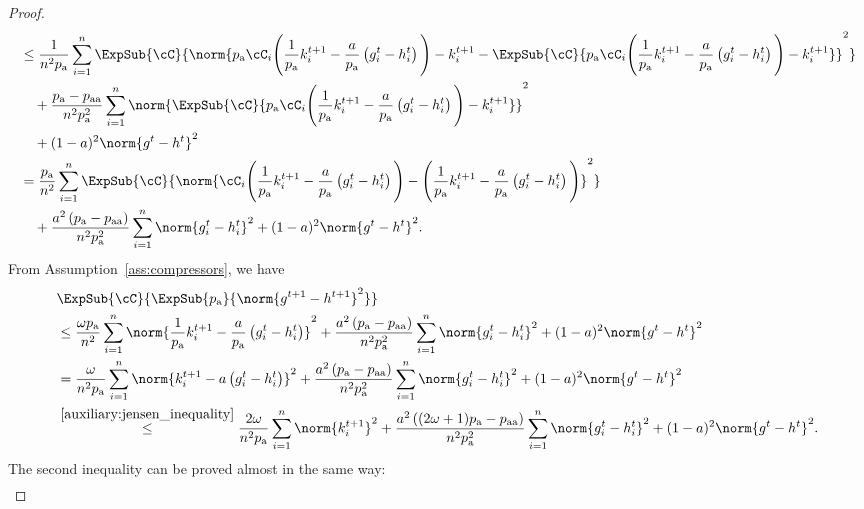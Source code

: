 \documentclass{article}
\newcommand*{\probavailable}{\ensuremath{p_{\textnormal{a}}}}
\newcommand*{\probpairaa}{\ensuremath{p_{\textnormal{aa}}}}
\begin{document}
\begin{proof}
\begin{align*}
    &\leq \frac{1}{n^2 \probavailable}\sum_{i=1}^n\ExpSub{\cC}{\norm{\probavailable\cC_i\Bigg(\frac{1}{\probavailable}k^{t+1}_i - \frac{a}{\probavailable} \left(g^{t}_i - h^{t}_i\right)\Bigg) - k^{t+1}_i - \ExpSub{\cC}{\probavailable\cC_i\Bigg(\frac{1}{\probavailable}k^{t+1}_i - \frac{a}{\probavailable} \left(g^{t}_i - h^{t}_i\right)\Bigg) - k^{t+1}_i}}^2} \\
    &\quad +\frac{\probavailable - \probpairaa}{n^2 \probavailable^2}\sum_{i=1}^n\norm{\ExpSub{\cC}{\probavailable\cC_i\Bigg(\frac{1}{\probavailable}k^{t+1}_i - \frac{a}{\probavailable} \left(g^{t}_i - h^{t}_i\right)\Bigg) - k^{t+1}_i}}^2 \\
    &\quad + (1 - a)^2\norm{g^{t} - h^{t}}^2 \\
    &= \frac{\probavailable}{n^2}\sum_{i=1}^n\ExpSub{\cC}{\norm{\cC_i\Bigg(\frac{1}{\probavailable}k^{t+1}_i - \frac{a}{\probavailable} \left(g^{t}_i - h^{t}_i\right)\Bigg) - \Bigg(\frac{1}{\probavailable}k^{t+1}_i - \frac{a}{\probavailable} \left(g^{t}_i - h^{t}_i\right)\Bigg)}^2} \\
    &\quad +\frac{a^2 \left(\probavailable - \probpairaa\right)}{n^2 \probavailable^2}\sum_{i=1}^n\norm{g^{t}_i - h^{t}_i}^2 + (1 - a)^2\norm{g^{t} - h^{t}}^2.
  \end{align*}
  From Assumption~\ref{ass:compressors}, we have
  \begin{align*}
    &\ExpSub{\cC}{\ExpSub{\probavailable}{\norm{g^{t+1} - h^{t+1}}^2}} \\
    &\leq \frac{\omega \probavailable}{n^2}\sum_{i=1}^n\norm{\frac{1}{\probavailable}k^{t+1}_i - \frac{a}{\probavailable} \left(g^{t}_i - h^{t}_i\right)}^2 +\frac{a^2 \left(\probavailable - \probpairaa\right)}{n^2 \probavailable^2}\sum_{i=1}^n\norm{g^{t}_i - h^{t}_i}^2 + (1 - a)^2\norm{g^{t} - h^{t}}^2 \\
    &= \frac{\omega}{n^2 \probavailable}\sum_{i=1}^n\norm{k^{t+1}_i - a \left(g^{t}_i - h^{t}_i\right)}^2 +\frac{a^2 \left(\probavailable - \probpairaa\right)}{n^2 \probavailable^2}\sum_{i=1}^n\norm{g^{t}_i - h^{t}_i}^2 + (1 - a)^2\norm{g^{t} - h^{t}}^2 \\
    &\overset{\eqref{auxiliary:jensen_inequality}}{\leq} \frac{2 \omega}{n^2 \probavailable}\sum_{i=1}^n\norm{k^{t+1}_i}^2 +\frac{a^2 \left((2\omega + 1)\probavailable - \probpairaa\right)}{n^2 \probavailable^2}\sum_{i=1}^n\norm{g^{t}_i - h^{t}_i}^2 + (1 - a)^2\norm{g^{t} - h^{t}}^2.
  \end{align*}
  The second inequality can be proved almost in the same way:
  \begin{align*}

\end{align*}
\end{proof}
\end{document}

